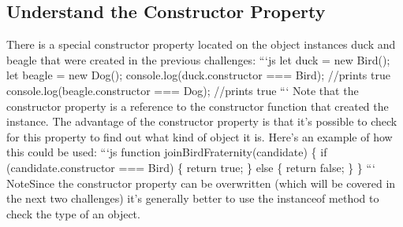 \documentclass{article}%
\begin{document}
\subsection{Understand the Constructor Property}%
\label{subsec:UnderstandtheConstructorProperty}%
There is a special constructor property located on the object instances duck and beagle that were created in the previous challenges:\newline%
```js\newline%
let duck = new Bird();\newline%
let beagle = new Dog();\newline%
console.log(duck.constructor === Bird);  //prints true\newline%
console.log(beagle.constructor === Dog);  //prints true\newline%
```\newline%
Note that the constructor property is a reference to the constructor function that created the instance.\newline%
The advantage of the constructor property is that it's possible to check for this property to find out what kind of object it is. Here's an example of how this could be used:\newline%
```js\newline%
function joinBirdFraternity(candidate) \{\newline%
  if (candidate.constructor === Bird) \{\newline%
    return true;\newline%
  \} else \{\newline%
    return false;\newline%
  \}\newline%
\}\newline%
```\newline%
NoteSince the constructor property can be overwritten (which will be covered in the next two challenges) it’s generally better to use the instanceof method to check the type of an object.\newline%

%
\end{document}
